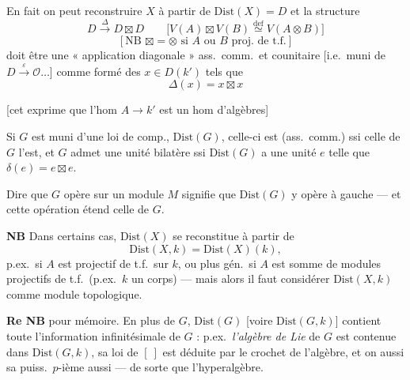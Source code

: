 \documentclass[11pt,a4paper]{article}
\begin{document}
En fait on peut reconstruire $X$ à partir de $\mathrm{Dist}(X) = D$ et la structure 
\[
  D \xrightarrow{\ \Delta\ } D \boxtimes D \qquad \bigl[V(A) \boxtimes V(B) \overset{\mathrm{def}}{\simeq} V(A \otimes B)\bigr]
\]
\[
  [\text{NB } \boxtimes = \otimes \text{ si } A \text{ ou } B \text{ proj.\ de t.f.}]
\]
doit être une « application diagonale » ass.\ comm.\ et counitaire [i.e.\ muni de $D \xrightarrow{\ \varepsilon\ } \mathcal{O} \ldots$] comme formé des $x \in D(k')$ tels que
\[
  \boxed{\ \Delta(x) = x \boxtimes x\ }
\]

[cet exprime que l'hom $A \to k'$ est un hom d'algèbres]

Si $G$ est muni d'une loi de comp., \ill{} \ill{} $\mathrm{Dist}(G)$, celle-ci est (ass.\ comm.) ssi celle de $G$ l'est, et  $G$ admet une unité bilatère ssi $\mathrm{Dist}(G)$ a une unité \struck{\ill{}} $e$ telle que $\delta(e) = e \boxtimes e$.

Dire que $G$ opère sur un module $M$  signifie que $\mathrm{Dist}(G)$ y opère à gauche --- et cette opération étend celle de $G$.

\textbf{NB} Dans certains cas, $\mathrm{Dist}(X)$ se reconstitue à partir de
\[
  \mathrm{Dist}(X, k) = \mathrm{Dist}(X)(k),
\]
p.ex.\ si $A$ est \struck{\ill{}} projectif de t.f.\ sur $k$, ou plus gén.\ si $A$ est somme de modules projectifs de t.f.\ (p.ex.\ $k$ un corps) --- mais alors il faut considérer $\mathrm{Dist}(X, k)$ comme module topologique.

\textbf{Re NB}   pour mémoire. En plus de $G$, $\mathrm{Dist}(G)$ [voire $\mathrm{Dist}(G, k)$] contient toute l'information infinitésimale de $G$ : p.ex.\ \emph{l'algèbre de Lie} de $G$ est contenue dans $\mathrm{Dist}(G, k)$,  sa loi de $[\ ]$ est déduite par le crochet de l'algèbre, et on  aussi sa puiss.\ $p$-ième aussi --- de sorte que l'hyperalgèbre.
\end{document}
